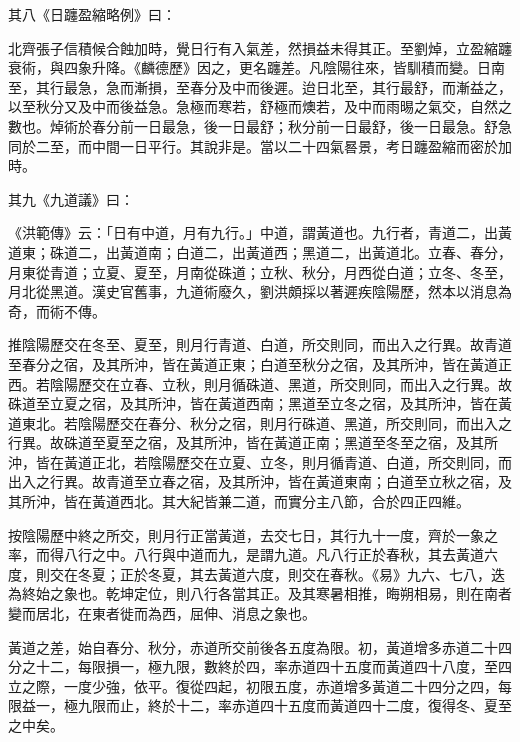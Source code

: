 
\begin{pinyinscope}

 其八《日躔盈縮略例》曰：



 北齊張子信積候合蝕加時，覺日行有入氣差，然損益未得其正。至劉焯，立盈縮躔衰術，與四象升降。《麟德歷》因之，更名躔差。凡陰陽往來，皆馴積而變。日南至，其行最急，急而漸損，至春分及中而後遲。迨日北至，其行最舒，而漸益之，以至秋分又及中而後益急。急極而寒若，舒極而燠若，及中而雨晹之氣交，自然之數也。焯術於春分前一日最急，後一日最舒；秋分前一日最舒，後一日最急。舒急同於二至，而中間一日平行。其說非是。當以二十四氣晷景，考日躔盈縮而密於加時。



 其九《九道議》曰：



 《洪範傳》云：「日有中道，月有九行。」中道，謂黃道也。九行者，青道二，出黃道東；硃道二，出黃道南；白道二，出黃道西；黑道二，出黃道北。立春、春分，月東從青道；立夏、夏至，月南從硃道；立秋、秋分，月西從白道；立冬、冬至，月北從黑道。漢史官舊事，九道術廢久，劉洪頗採以著遲疾陰陽歷，然本以消息為奇，而術不傳。



 推陰陽歷交在冬至、夏至，則月行青道、白道，所交則同，而出入之行異。故青道至春分之宿，及其所沖，皆在黃道正東；白道至秋分之宿，及其所沖，皆在黃道正西。若陰陽歷交在立春、立秋，則月循硃道、黑道，所交則同，而出入之行異。故硃道至立夏之宿，及其所沖，皆在黃道西南；黑道至立冬之宿，及其所沖，皆在黃道東北。若陰陽歷交在春分、秋分之宿，則月行硃道、黑道，所交則同，而出入之行異。故硃道至夏至之宿，及其所沖，皆在黃道正南；黑道至冬至之宿，及其所沖，皆在黃道正北，若陰陽歷交在立夏、立冬，則月循青道、白道，所交則同，而出入之行異。故青道至立春之宿，及其所沖，皆在黃道東南；白道至立秋之宿，及其所沖，皆在黃道西北。其大紀皆兼二道，而實分主八節，合於四正四維。



 按陰陽歷中終之所交，則月行正當黃道，去交七日，其行九十一度，齊於一象之率，而得八行之中。八行與中道而九，是謂九道。凡八行正於春秋，其去黃道六度，則交在冬夏；正於冬夏，其去黃道六度，則交在春秋。《易》九六、七八，迭為終始之象也。乾坤定位，則八行各當其正。及其寒暑相推，晦朔相易，則在南者變而居北，在東者徙而為西，屈伸、消息之象也。



 黃道之差，始自春分、秋分，赤道所交前後各五度為限。初，黃道增多赤道二十四分之十二，每限損一，極九限，數終於四，率赤道四十五度而黃道四十八度，至四立之際，一度少強，依平。復從四起，初限五度，赤道增多黃道二十四分之四，每限益一，極九限而止，終於十二，率赤道四十五度而黃道四十二度，復得冬、夏至之中矣。




\end{pinyinscope}

